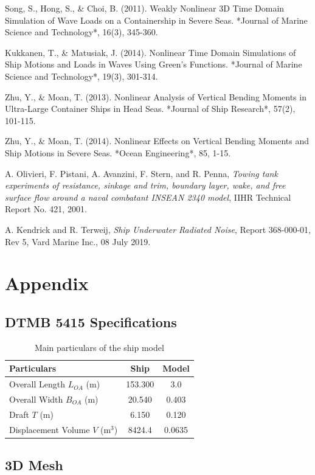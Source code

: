 \documentclass[12pt]{article} %
\begin{document}
\begin{thebibliography}{99}
     Song, S., Hong, S., \& Choi, B. (2011). Weakly Nonlinear 3D Time Domain Simulation of Wave Loads on a Containership in Severe Seas. *Journal of Marine Science and Technology*, 16(3), 345-360.

     Kukkanen, T., \& Matusiak, J. (2014). Nonlinear Time Domain Simulations of Ship Motions and Loads in Waves Using Green's Functions. *Journal of Marine Science and Technology*, 19(3), 301-314.

     Zhu, Y., \& Moan, T. (2013). Nonlinear Analysis of Vertical Bending Moments in Ultra-Large Container Ships in Head Seas. *Journal of Ship Research*, 57(2), 101-115.

     Zhu, Y., \& Moan, T. (2014). Nonlinear Effects on Vertical Bending Moments and Ship Motions in Severe Seas. *Ocean Engineering*, 85, 1-15.

    A. Olivieri, F. Pistani, A. Avanzini, F. Stern, and R. Penna, \emph{Towing tank experiments of resistance, sinkage and trim, boundary layer, wake, and free surface flow around a naval combatant INSEAN 2340 model}, IIHR Technical Report No. 421, 2001.
    
    A. Kendrick and R. Terweij, \emph{Ship Underwater Radiated Noise}, Report 368-000-01, Rev 5, Vard Marine Inc., 08 July 2019.   
    
    
\end{thebibliography}

\section{Appendix}
\subsection{DTMB 5415 Specifications}
\begin{table}[h!]
    \centering
    \begin{tabular}{|l|c|c|}
        \hline
        \textbf{Particulars} & \textbf{Ship} & \textbf{Model} \\ \hline
        Overall Length $L_{OA}$ (m) & 153.300 & 3.0 \\ \hline
        Overall Width $B_{OA}$ (m) & 20.540 & 0.403 \\ \hline
        Draft $T$ (m) & 6.150 & 0.120 \\ \hline
        Displacement Volume $V$ (m$^3$) & 8424.4 & 0.0635 \\ \hline
        \end{tabular}
    \caption{Main particulars of the ship model}
\end{table}
\subsection{3D Mesh}
\end{document}
